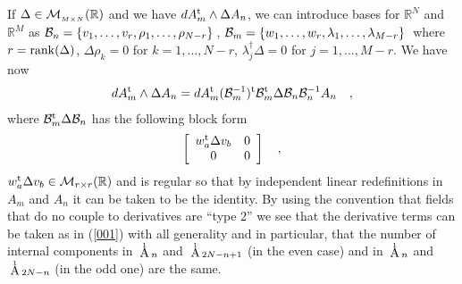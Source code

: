 \documentclass[prd,a4paper,twocolumn,amssymb,amsmath,nofootinbib,showpacs]{revtex4}
\newcommand{\au}{
\begin{picture}(11,3)(-2,-2)
\put(2,5){$\scriptscriptstyle{1}$} \put(0,-3){A}
\end{picture}}
\begin{document}
If $\Delta\in{\cal M}_{_{M\times N}}(\mathbb{R})$ and we have
$dA^{\rm{t}}_m\wedge\Delta A_n$, we can introduce bases for
$\mathbb{R}^{N}$ and $\mathbb{R}^{M}$ as ${\cal
B}_n=\{v_{1},\dots,v_{r},\rho_{1},\dots,\rho_{N-r}\}\,$, ${\cal
B}_m=\{w_{1},\dots,w_{r},\lambda_{1},\dots,\lambda_{M-r}\}\,$
where $r={\rm rank}(\Delta)$, $\Delta \rho_{k}=0$ for
$k=1,\dots,N-r$, $\lambda_{j}^{\dagger}\Delta=0$ for
$j=1,\dots,M-r$. We have now
\begin{eqnarray}
dA^{\rm{t}}_m\wedge \Delta A_n= dA^{\rm{t}}_m({\cal
B}_m^{-1})^{\rm{t}} {\cal B}_m^{\rm{t}}\Delta{\cal B}_n {\cal
B}_n^{-1}A_n\nonumber\quad,
\end{eqnarray}
where ${\cal B}_m^{\rm{t}}\Delta{\cal B}_n $ has the following
block form
\begin{eqnarray}
\left[   \begin{array}{cc} w_{a}^{\rm{t}}\Delta v_{b}
&0\\0&0\end{array}\right] \nonumber\quad,
\end{eqnarray}
$w_{a}^{\rm{t}}\Delta v_{b} \in{\cal M}_{r\times r}(\mathbb{R})$
and is regular so that by independent linear redefinitions in
$A_m$ and $A_n$ it can be taken to be the identity. By using the
convention that fields that do no couple to derivatives are ``type
2'' we see that the derivative terms can be taken as in
(\ref{001}) with all generality and in particular, that the number
of internal components in $\au_n$ and $\au_{2N-n+1}$ (in the even
case) and in $\au_n$ and $\au_{2N-n}$ (in the odd one) are the
same.
\end{document}
